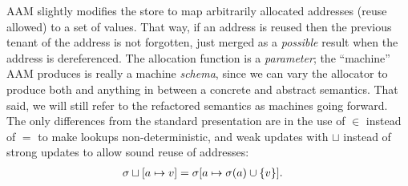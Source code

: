 AAM slightly modifies the store to map arbitrarily allocated addresses (reuse allowed) to a set of values.
%
That way, if an address is reused then the previous tenant of the address is not forgotten, just merged as a \emph{possible} result when the address is dereferenced.
%
The allocation function is a \emph{parameter}; the ``machine'' AAM produces is really a machine \emph{schema}, since we can vary the allocator to produce both and anything in between a concrete and abstract semantics.
%
That said, we will still refer to the refactored semantics as machines going forward.
%
%
The only differences from the standard presentation are in the use of $\in$ instead of $=$ to make lookups non-deterministic, and weak updates with $\sqcup$ instead of strong updates to allow sound reuse of addresses:
%
\begin{align*}
  \sigma\sqcup[a \mapsto v] &= \sigma[a \mapsto \sigma(a)\cup\{ v \}]\text.
\end{align*}



